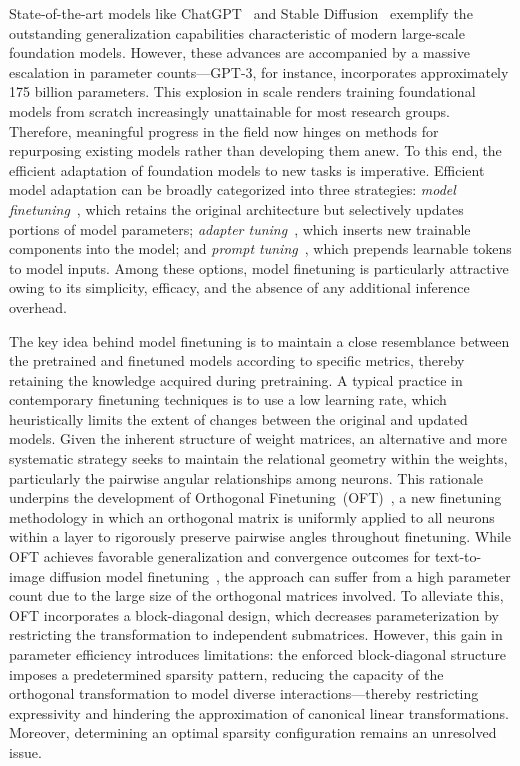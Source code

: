 State-of-the-art models like ChatGPT~\cite{brown2020language,chen2021evaluating} and Stable Diffusion~\cite{rombach2022high} exemplify the outstanding generalization capabilities characteristic of modern large-scale foundation models. However, these advances are accompanied by a massive escalation in parameter counts—GPT-3, for instance, incorporates approximately 175 billion parameters. This explosion in scale renders training foundational models from scratch increasingly unattainable for most research groups. Therefore, meaningful progress in the field now hinges on methods for repurposing existing models rather than developing them anew. To this end, the efficient adaptation of foundation models to new tasks is imperative. Efficient model adaptation can be broadly categorized into three strategies: \emph{model finetuning}~\cite{hulora2022,zaken2022bitfit,guo2020parameter,raffel2020exploring,qiu2023controlling,zhang2022adaptive,chavan2023one}, which retains the original architecture but selectively updates portions of model parameters; \emph{adapter tuning}~\cite{rebuffi2017learning,houlsby2019parameter,pfeiffer2020adapterfusion,lin2020exploring,he2021towards}, which inserts new trainable components into the model; and \emph{prompt tuning}~\cite{li2021prefix,lester2021power}, which prepends learnable tokens to model inputs. Among these options, model finetuning is particularly attractive owing to its simplicity, efficacy, and the absence of any additional inference overhead.

The key idea behind model finetuning is to maintain a close resemblance between the pretrained and finetuned models according to specific metrics, thereby retaining the knowledge acquired during pretraining. A typical practice in contemporary finetuning techniques is to use a low learning rate, which heuristically limits the extent of changes between the original and updated models. Given the inherent structure of weight matrices, an alternative and more systematic strategy seeks to maintain the relational geometry within the weights, particularly the pairwise angular relationships among neurons. This rationale underpins the development of Orthogonal Finetuning~(OFT)~\cite{qiu2023controlling}, a new finetuning methodology in which an orthogonal matrix is uniformly applied to all neurons within a layer to rigorously preserve pairwise angles throughout finetuning. While OFT achieves favorable generalization and convergence outcomes for text-to-image diffusion model finetuning~\cite{qiu2023controlling}, the approach can suffer from a high parameter count due to the large size of the orthogonal matrices involved. To alleviate this, OFT incorporates a block-diagonal design, which decreases parameterization by restricting the transformation to independent submatrices. However, this gain in parameter efficiency introduces limitations: the enforced block-diagonal structure imposes a predetermined sparsity pattern, reducing the capacity of the orthogonal transformation to model diverse interactions—thereby restricting expressivity and hindering the approximation of canonical linear transformations. Moreover, determining an optimal sparsity configuration remains an unresolved issue.

